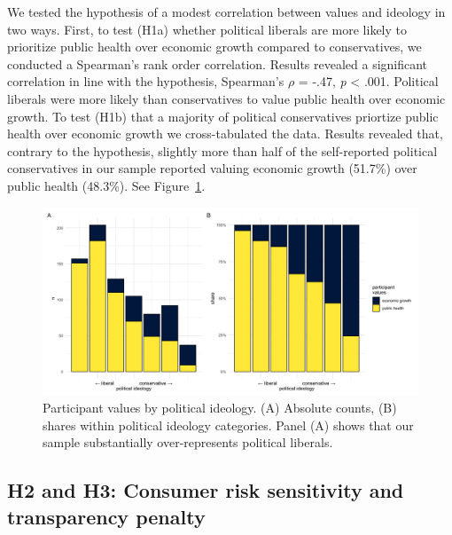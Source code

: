 \documentclass[
  letterpaper,
  DIV=11,
  numbers=noendperiod]{scrartcl}
\begin{document}
We tested the hypothesis of a modest correlation between values and
ideology in two ways. First, to test (H1a) whether political liberals
are more likely to prioritize public health over economic growth
compared to conservatives, we conducted a Spearman's rank order
correlation. Results revealed a significant correlation in line with the
hypothesis, Spearman's \(\rho\) = -.47, \emph{p} \textless{} .001.
Political liberals were more likely than conservatives to value public
health over economic growth. To test (H1b) that a majority of political
conservatives priortize public health over economic growth we
cross-tabulated the data. Results revealed that, contrary to the
hypothesis, slightly more than half of the self-reported political
conservatives in our sample reported valuing economic growth (51.7\%)
over public health (48.3\%). See Figure~\ref{fig-part-values}.

\begin{figure}

{\centering \includegraphics{fig2_part_values.png}

}

\caption{\label{fig-part-values}Participant values by political
ideology. (A) Absolute counts, (B) shares within political ideology
categories. Panel (A) shows that our sample substantially
over-represents political liberals.}

\end{figure}

\hypertarget{h2-and-h3-consumer-risk-sensitivity-and-transparency-penalty}{%
\subsection{H2 and H3: Consumer risk sensitivity and transparency
penalty}\label{h2-and-h3-consumer-risk-sensitivity-and-transparency-penalty}}
\end{document}
